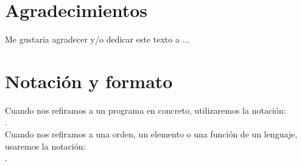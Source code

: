 

\section*{Agradecimientos}

Me gustaría agradecer y/o dedicar este texto a ...

\cleardoublepage


%
%

\cleardoublepage

\section*{Notación y formato}

Cuando nos refiramos a un programa en concreto, utilizaremos la
notación: \\ .\\

Cuando nos refiramos a una orden, un elemento o una función de un lenguaje, usaremos
la notación: \\ .\\